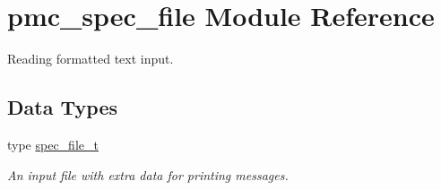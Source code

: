 \hypertarget{namespacepmc__spec__file}{}\section{pmc\+\_\+spec\+\_\+file Module Reference}
\label{namespacepmc__spec__file}


Reading formatted text input.  


\subsection*{Data Types}
\begin{DoxyCompactItemize}
\item 
type \mbox{\hyperlink{structpmc__spec__file_1_1spec__file__t}{spec\+\_\+file\+\_\+t}}
\begin{DoxyCompactList}\small\item\em An input file with extra data for printing messages. \end{DoxyCompactList}\end{DoxyCompactItemize}
